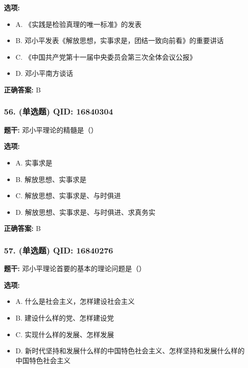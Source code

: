 \documentclass[12pt,UTF8]{ctexart}
\begin{document}
\textbf{选项:}
\begin{itemize}[leftmargin=*]

  \item A. 《实践是检验真理的唯一标准》的发表

  \item B. 邓小平发表《解放思想，实事求是，团结一致向前看》的重要讲话

  \item C. 《中国共产党第十一届中央委员会第三次全体会议公报》

  \item D. 邓小平南方谈话

\end{itemize}

\textbf{正确答案:}
B

\vspace{0.3em}\hrulefill\vspace{0.7em}

\subsubsection*{56. (单选题) \small QID: 16840304}

\textbf{题干:}
邓小平理论的精髓是（）

\textbf{选项:}
\begin{itemize}[leftmargin=*]

  \item A. 实事求是

  \item B. 解放思想、实事求是

  \item C. 解放思想、实事求是、与时俱进

  \item D. 解放思想、实事求是、与时俱进、求真务实

\end{itemize}

\textbf{正确答案:}
B

\vspace{0.3em}\hrulefill\vspace{0.7em}

\subsubsection*{57. (单选题) \small QID: 16840276}

\textbf{题干:}
邓小平理论首要的基本的理论问题是（）

\textbf{选项:}
\begin{itemize}[leftmargin=*]

  \item A. 什么是社会主义，怎样建设社会主义

  \item B. 建设什么样的党、怎样建设党

  \item C. 实现什么样的发展、怎样发展

  \item D. 新时代坚持和发展什么样的中国特色社会主义、怎样坚持和发展什么样的中国特色社会主义

\end{itemize}
\end{document}
